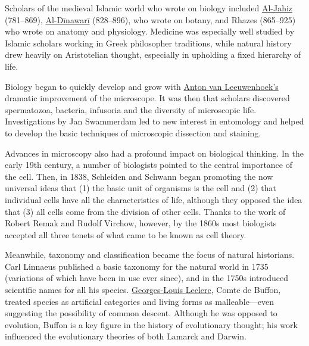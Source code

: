 \documentclass[
]{article}
\begin{document}
Scholars of the medieval Islamic world who wrote on biology included
\href{https://en.wikipedia.org/wiki/Al-Jahiz}{Al-Jahiz} (781--869),
\href{https://en.wikipedia.org/wiki/Abu_Hanifa_Dinawari}{Al-Dīnawarī}
(828--896), who wrote on botany, and Rhazes (865--925) who wrote on
anatomy and physiology. Medicine was especially well studied by Islamic
scholars working in Greek philosopher traditions, while natural history
drew heavily on Aristotelian thought, especially in upholding a fixed
hierarchy of life.

Biology began to quickly develop and grow with
\href{https://en.wikipedia.org/wiki/Antonie_van_Leeuwenhoek}{Anton van
Leeuwenhoek's} dramatic improvement of the microscope. It was then that
scholars discovered spermatozoa, bacteria, infusoria and the diversity
of microscopic life. Investigations by Jan Swammerdam led to new
interest in entomology and helped to develop the basic techniques of
microscopic dissection and staining.

Advances in microscopy also had a profound impact on biological
thinking. In the early 19th century, a number of biologists pointed to
the central importance of the cell. Then, in 1838, Schleiden and Schwann
began promoting the now universal ideas that (1) the basic unit of
organisms is the cell and (2) that individual cells have all the
characteristics of life, although they opposed the idea that (3) all
cells come from the division of other cells. Thanks to the work of
Robert Remak and Rudolf Virchow, however, by the 1860s most biologists
accepted all three tenets of what came to be known as cell theory.

Meanwhile, taxonomy and classification became the focus of natural
historians. Carl Linnaeus published a basic taxonomy for the natural
world in 1735 (variations of which have been in use ever since), and in
the 1750s introduced scientific names for all his species.
\href{https://en.wikipedia.org/wiki/Georges-Louis_Leclerc,_Comte_de_Buffon}{Georges-Louis
Leclerc}, Comte de Buffon, treated species as artificial categories and
living forms as malleable---even suggesting the possibility of common
descent. Although he was opposed to evolution, Buffon is a key figure in
the history of evolutionary thought; his work influenced the
evolutionary theories of both Lamarck and Darwin.
\end{document}
